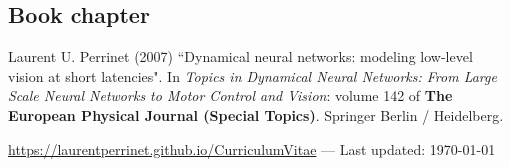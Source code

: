 \documentclass[11pt, a4paper]{article}
\newcommand{\Website}{https://laurentperrinet.github.io}
\newcommand{\doi}[1]{\href{#1}{\scriptsize\textsc{[doi]}}}
\newcommand{\years}[1]{\marginnote{\scriptsize #1}}
\providecommand{\doi}[1]{doi: #1}\else
\providecommand{\doi}{doi: \begingroup \urlstyle{rm}\Url}\fi
\begin{document}
\subsection*{Book chapter}

\noindent\years{2007}Laurent U. Perrinet (2007) “Dynamical neural networks: modeling low-level vision at short latencies".  In \emph{Topics in Dynamical Neural Networks: From Large Scale Neural Networks to Motor Control and Vision}: volume 142 of {\bf The European Physical Journal (Special Topics)}.  Springer Berlin / Heidelberg.%


%
%

\vfill{}
\hrulefill

\begin{center}

{\footnotesize \href{\Website/CurriculumVitae}{\Website/CurriculumVitae} — Last updated: \today
}
\end{center}
\end{document}
